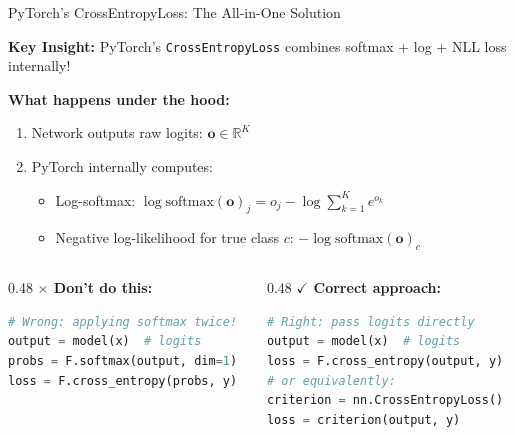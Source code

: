 \documentclass[xcolor=svgnames, 8pt, handout, standalone]{beamer}
\newcommand{\1}{\mathbf{1}}
\begin{document}
\begin{frame}[fragile]{PyTorch's CrossEntropyLoss: The All-in-One Solution}
\begin{tcolorbox}[colback=lightyellow, colframe=energyorange, boxrule=2pt]
\centering
\textbf{Key Insight:} PyTorch's \texttt{CrossEntropyLoss} combines softmax + log + NLL loss internally!
\end{tcolorbox}

\vspace{1em}
\textbf{What happens under the hood:}
\begin{enumerate}
\item Network outputs raw logits: $\mathbf{o} \in \mathbb{R}^K$
\item PyTorch internally computes:
\begin{itemize}
\item Log-softmax: $\log\mathrm{softmax}(\mathbf{o})_j = o_j - \log\sum_{k=1}^K e^{o_k}$
\item Negative log-likelihood for true class $c$: $-\log\mathrm{softmax}(\mathbf{o})_c$
\end{itemize}
\end{enumerate}

\begin{columns}
\begin{column}{0.48\textwidth}
\textbf{$\boldsymbol{\times}$ Don't do this:}
\begin{lstlisting}[language=Python]
# Wrong: applying softmax twice!
output = model(x)  # logits
probs = F.softmax(output, dim=1)
loss = F.cross_entropy(probs, y)
\end{lstlisting}
\end{column}
\begin{column}{0.48\textwidth}
\textbf{$\boldsymbol{\checkmark}$ Correct approach:}
\begin{lstlisting}[language=Python]
# Right: pass logits directly
output = model(x)  # logits
loss = F.cross_entropy(output, y)
# or equivalently:
criterion = nn.CrossEntropyLoss()
loss = criterion(output, y)
\end{lstlisting}
\end{column}
\end{columns}
\end{frame}
\end{document}
